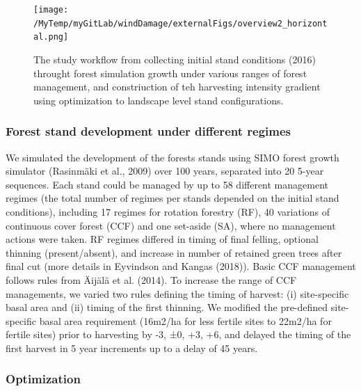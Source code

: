 \documentclass[]{elsarticle} %
\begin{document}
\begin{figure}
\centering
\texttt{[image: /MyTemp/myGitLab/windDamage/externalFigs/overview2\_horizontal.png]}
\caption{The study workflow from collecting initial stand conditions
(2016) throught forest simulation growth under various ranges of forest
management, and constriuction of teh harvesting intensity gradient using
optimization to landscape level stand configurations.\label{workflow}}
\end{figure}

\hypertarget{forest-stand-development-under-different-regimes}{%
\subsubsection{Forest stand development under different
regimes}\label{forest-stand-development-under-different-regimes}}

We simulated the development of the forests stands using SIMO forest
growth simulator (Rasinmäki et al., 2009) over 100 years, separated into
20 5-year sequences. Each stand could be managed by up to 58 different
management regimes (the total number of regimes per stands depended on
the initial stand conditions), including 17 regimes for rotation
forestry (RF), 40 variations of continuous cover forest (CCF) and one
set-aside (SA), where no management actions were taken. RF regimes
differed in timing of final felling, optional thinning (present/absent),
and increase in number of retained green trees after final cut (more
details in Eyvindson and Kangas (2018)). Basic CCF management follows
rules from Äijälä et al. (2014). To increase the range of CCF
managements, we varied two rules defining the timing of harvest: (i)
site-specific basal area and (ii) timing of the first thinning. We
modified the pre-defined site-specific basal area requirement (16m2/ha
for less fertile sites to 22m2/ha for fertile sites) prior to harvesting
by -3, ±0, +3, +6, and delayed the timing of the first harvest in 5 year
increments up to a delay of 45 years.

\hypertarget{optimization}{%
\subsubsection{Optimization}\label{optimization}}
\end{document}
